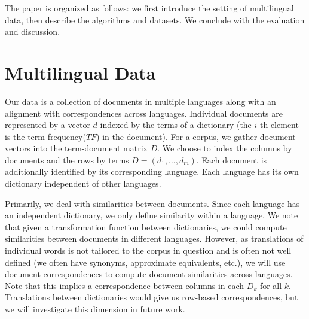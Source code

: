 \documentclass{article} %
\begin{document}
The paper is organized as follows: we first introduce the setting
of multilingual data, then describe the algorithms and
datasets. We conclude with the evaluation and discussion.
\begin{comment}
Concepts and... are important across countries. However, much of
what we do is still determined by language. While the Internet
originally had English content almost exclusively, now there is a
diversity of different languages well beyond bi-lingual into
truly multi-lingual territory.

The goal when doing dimensionality reduction on data is to
capture the ``important parts'' of an underlying dataset. These
will preserve the properties of the original high dimensional
data, but faster to deal with algorithmically and highlight the
components (or mixtures thereof) which best explain the data
making it useful for interpretation during analysis as well.

metric analysis

The most common representation of the

metric space....

multilingual is important....


Initially distance of kernel similarity matrices are not only
have an approximate low rank structure, but for this study we
look at matrix with additional structure.

We can view our


 Special structure of multi-lingual data
\end{comment}
\section{Multilingual Data}

Our data is a collection of documents in multiple languages along
with an alignment with correspondences across
languages. Individual documents are represented by a vector $d$
indexed by the terms of a dictionary (the $i$-th element is the
term frequency($TF$) in the document). For a corpus, we gather
document vectors into the term-document matrix $D$.  We choose to
index the columns by documents and the rows by terms $D = (d_1 ,
\ldots , d_m )$. Each document is additionally identified by its
corresponding language. Each language has its own dictionary
independent of other languages.

Primarily, we deal with similarities between documents. Since
each language has an independent dictionary, we only define
similarity within a language. We note that given a
transformation function between dictionaries, we could compute
similarities between documents in different languages. However,
as translations of individual words is not tailored to the corpus
in question and is often not well defined (we often have
synonyms, approximate equivalents, etc.), we will use document
correspondences to compute document similarities across
languages. Note that this implies a correspondence between
columns in each $D_k$ for all $k$. Translations between
dictionaries would give us row-based correspondences, but we will
investigate this dimension in future work.
\end{document}
